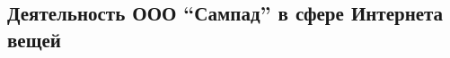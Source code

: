 \subsection{Деятельность ООО \enquote{Сампад} в сфере Интернета вещей}
\label{sec:develop:companyGarlands}




